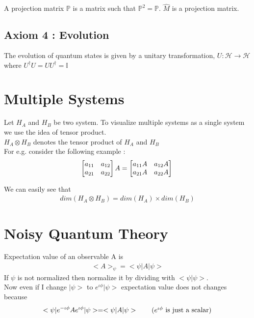 \documentclass{article}
\begin{document}
A projection matrix $\mathbb{P}$ is a matrix such that $\mathbb{P}^2 = \mathbb{P}$.
$\hat{M}$ is a projection matrix.


\subsection{Axiom 4 : Evolution}
The evolution of quantum states is given by a unitary transformation, ${U : \mathcal{H} \rightarrow \mathcal{H}}$ where $U^{\dagger}U = UU^{\dagger} = \mathbb{I}$

\section{Multiple Systems}
Let $H_{A}$ and $H_B$ be two system. To visualize multiple systems as a single system we use the idea of tensor product.\\
$H_A \otimes H_B$ denotes the tensor product of $H_A$ and $H_B$\\
For e.g. consider the following example : \\ \newline
\[
\begin{bmatrix}
	a_{11} & a_{12} \\
	a_{21} & a_{22} 
\end{bmatrix}
A = \begin{bmatrix}
a_{11}A & a_{12}A \\
a_{21}A & a_{22}A
\end{bmatrix}\\
\]

We can easily see that
\begin{align*}
	dim(H_A \otimes H_B) = dim(H_A)\times dim(H_B) 
\end{align*}
\section{Noisy Quantum Theory}
Expectation value of an observable A is
\begin{align*}
	<A>_{\psi} = <\psi|A|\psi> 
\end{align*}
If $\psi$ is not normalized then normalize it by dividing with $<\psi|\psi>$.\\
Now even if I change $|\psi>$ to $e^{\iota\phi}|\psi>$ expectation value does not changes because \\
\begin{align*}
	<\psi|e^{-\iota\phi} A e^{\iota\phi}|\psi> = <\psi|A|\psi>  \tag*{($e^{\iota\phi}$ is just a scalar)} 
\end{align*}
\end{document}
